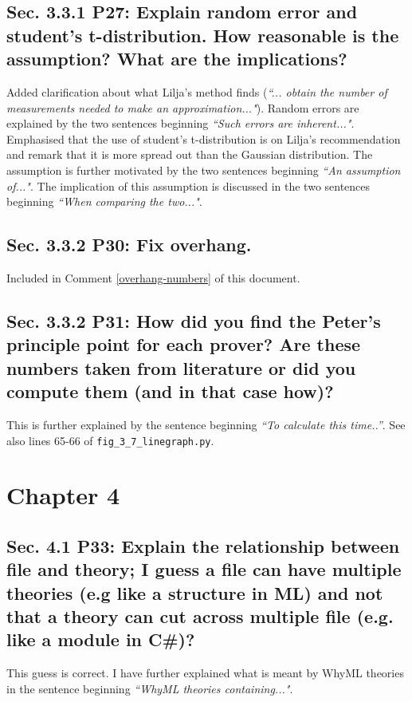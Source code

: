 \documentclass[]{article}
\begin{document}
\subsection{Sec. 3.3.1 P27: Explain random error and student's t-distribution. How reasonable is the assumption? What are the implications?}

Added clarification about what Lilja's method finds (\emph{``... obtain the number of measurements needed to make an approximation..."}). 
Random errors are explained by the two sentences beginning \emph{``Such errors are inherent..."}.
Emphasised that the use of student's t-distribution is on Lilja's recommendation and remark that it is more spread out than the Gaussian distribution. 
The assumption is further motivated by the two sentences beginning \emph{``An assumption of..."}.
The implication of this assumption is discussed in the two sentences beginning \emph{``When comparing the two..."}.

\subsection{Sec. 3.3.2 P30: Fix overhang.}

Included in Comment \ref{overhang-numbers} of this document.

\subsection{Sec. 3.3.2 P31: How did you find the Peter's principle point for each prover? Are these numbers taken from literature or did you compute them (and in that case how)?}

This is further explained by the sentence beginning \emph{``To calculate this time..''}. See also lines 65-66 of \texttt{fig\_3\_7\_linegraph.py}.

\section{Chapter 4}

\subsection{Sec. 4.1 P33: Explain the relationship between file and theory; I guess a file can have multiple theories (e.g like a structure in ML) and not that a theory can cut across multiple file (e.g. like a module in C\#)?}

This guess is correct. I have further explained what is meant by WhyML theories in the sentence beginning \emph{``WhyML theories containing..."}.
\end{document}
